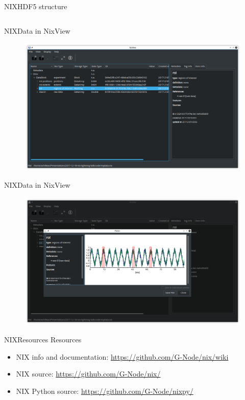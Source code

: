 \documentclass[10pt]{beamer}
\begin{document}
\begin{frame}[fragile]{NIX}{HDF5 structure}
    \inputminted[fontsize=\footnotesize]{shell}{./code/h5ls.out}
\end{frame}

\begin{frame}{NIX}{Data in NixView}
    \begin{figure}
        \includegraphics[width=\textwidth]{nixview-data.png}
    \end{figure}
\end{frame}

\begin{frame}{NIX}{Data in NixView}
    \begin{figure}
        \includegraphics[width=\textwidth]{nixview-plot.png}
    \end{figure}
\end{frame}

\begin{frame}{NIX}{Resources}
    Resources

    \begin{itemize}
        \item NIX info and documentation: \url{https://github.com/G-Node/nix/wiki}
        \item NIX source: \url{https://github.com/G-Node/nix/}
        \item NIX Python source: \url{https://github.com/G-Node/nixpy/}
    \end{itemize}
\end{frame}
\end{document}

